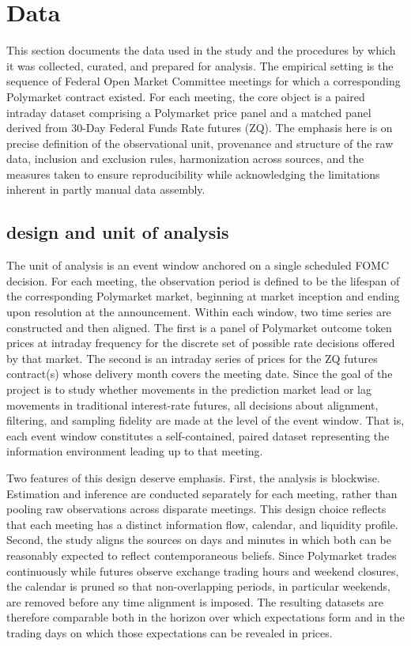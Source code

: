 
\section{Data}


This section documents the data used in the study and the procedures by which it was collected, curated, and prepared for analysis. The empirical setting is the sequence of Federal Open Market Committee meetings for which a corresponding Polymarket contract existed. For each meeting, the core object is a paired intraday dataset comprising a Polymarket price panel and a matched panel derived from 30-Day Federal Funds Rate futures (ZQ). The emphasis here is on precise definition of the observational unit, provenance and structure of the raw data, inclusion and exclusion rules, harmonization across sources, and the measures taken to ensure reproducibility while acknowledging the limitations inherent in partly manual data assembly.

\subsection{design and unit of analysis}

The unit of analysis is an event window anchored on a single scheduled FOMC decision. For each meeting, the observation period is defined to be the lifespan of the corresponding Polymarket market, beginning at market inception and ending upon resolution at the announcement. Within each window, two time series are constructed and then aligned. The first is a panel of Polymarket outcome token prices at intraday frequency for the discrete set of possible rate decisions offered by that market. The second is an intraday series of prices for the ZQ futures contract(s) whose delivery month covers the meeting date. Since the goal of the project is to study whether movements in the prediction market lead or lag movements in traditional interest-rate futures, all decisions about alignment, filtering, and sampling fidelity are made at the level of the event window. That is, each event window constitutes a self-contained, paired dataset representing the information environment leading up to that meeting.

Two features of this design deserve emphasis. First, the analysis is blockwise. Estimation and inference are conducted separately for each meeting, rather than pooling raw observations across disparate meetings. This design choice reflects that each meeting has a distinct information flow, calendar, and liquidity profile. Second, the study aligns the sources on days and minutes in which both can be reasonably expected to reflect contemporaneous beliefs. Since Polymarket trades continuously while futures observe exchange trading hours and weekend closures, the calendar is pruned so that non-overlapping periods, in particular weekends, are removed before any time alignment is imposed. The resulting datasets are therefore comparable both in the horizon over which expectations form and in the trading days on which those expectations can be revealed in prices.

